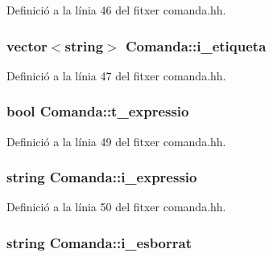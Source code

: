 Definició a la línia 46 del fitxer comanda.\-hh.

\hypertarget{class_comanda_a1d193f66ea6d2681ab79a16192da3114}{
\subsubsection[{i\-\_\-etiqueta}]{\setlength{\rightskip}{0pt plus 5cm}vector$<$string$>$ Comanda\-::i\-\_\-etiqueta\hspace{0.3cm}{\ttfamily [private]}}}\label{class_comanda_a1d193f66ea6d2681ab79a16192da3114}


Definició a la línia 47 del fitxer comanda.\-hh.

\hypertarget{class_comanda_ac7037525fc1cd9f49b02bd87cf4b6123}{
\subsubsection[{t\-\_\-expressio}]{\setlength{\rightskip}{0pt plus 5cm}bool Comanda\-::t\-\_\-expressio\hspace{0.3cm}{\ttfamily [private]}}}\label{class_comanda_ac7037525fc1cd9f49b02bd87cf4b6123}


Definició a la línia 49 del fitxer comanda.\-hh.

\hypertarget{class_comanda_a9236cdc5142b6a9f4116673abce06508}{
\subsubsection[{i\-\_\-expressio}]{\setlength{\rightskip}{0pt plus 5cm}string Comanda\-::i\-\_\-expressio\hspace{0.3cm}{\ttfamily [private]}}}\label{class_comanda_a9236cdc5142b6a9f4116673abce06508}


Definició a la línia 50 del fitxer comanda.\-hh.

\hypertarget{class_comanda_a269a43d5b283a23792791a2ba67747b0}{
\subsubsection[{i\-\_\-esborrat}]{\setlength{\rightskip}{0pt plus 5cm}string Comanda\-::i\-\_\-esborrat\hspace{0.3cm}{\ttfamily [private]}}}\label{class_comanda_a269a43d5b283a23792791a2ba67747b0}


